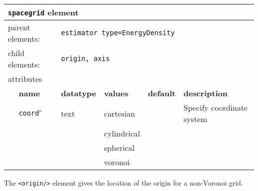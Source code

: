 \FloatBarrier
\begin{table}[h]
\begin{center}
\begin{tabularx}{\textwidth}{l l l l l l }
\hline
\multicolumn{6}{l}{\texttt{spacegrid} element} \\
\hline
\multicolumn{2}{l}{parent elements:} & \multicolumn{4}{l}{\texttt{estimator type=EnergyDensity}}\\
\multicolumn{2}{l}{child  elements:} & \multicolumn{4}{l}{\texttt{origin, axis}}\\
\multicolumn{2}{l}{attributes}  & \multicolumn{4}{l}{}\\
   &   \bfseries name     & \bfseries datatype & \bfseries values & \bfseries default   & \bfseries description \\
   &   \texttt{coord}$^r$ &  text              & cartesian        &                     & Specify coordinate system \\
   &                      &                    & cylindrical      &                     &                           \\
   &                      &                    & spherical        &                     &                           \\
   &                      &                    & voronoi          &                     &                           \\
  \hline
\end{tabularx}
\end{center}
\end{table}
\FloatBarrier


The \texttt{<origin/>} element gives the location of the origin for a non-Voronoi grid.

